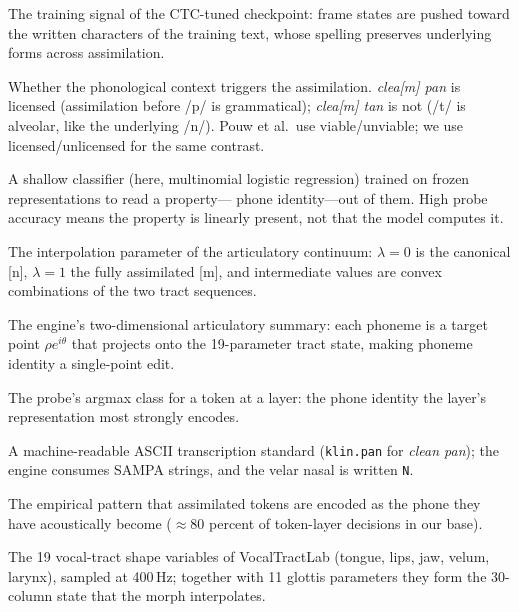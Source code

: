 \documentclass[11pt,a4paper]{article}
\newcommand{\sampa}[1]{\texttt{#1}}
\newcommand{\lam}{\lambda}
\begin{document}
\begin{description}[leftmargin=1.4em, itemsep=3pt, font=\normalfont\bfseries]
\item[Letter supervision] The training signal of the CTC-tuned
checkpoint: frame states are pushed toward the written characters of
the training text, whose spelling preserves underlying forms across
assimilation.

\item[Licensing (viable / unviable)] Whether the phonological
context triggers the assimilation. \emph{clea[m] pan} is licensed
(assimilation before /p/ is grammatical); \emph{clea[m] tan} is not
(/t/ is alveolar, like the underlying /n/). Pouw et al.\ use
viable/unviable; we use licensed/unlicensed for the same contrast.

\item[Linear probe] A shallow classifier (here, multinomial logistic
regression) trained on frozen representations to read a property---
phone identity---out of them. High probe accuracy means the property
is linearly present, not that the model computes it.

\item[Morph strength ($\lam$)] The interpolation parameter of the
articulatory continuum: $\lam=0$ is the canonical [n], $\lam=1$ the
fully assimilated [m], and intermediate values are convex
combinations of the two tract sequences.

\item[Polar control plane] The engine's two-dimensional articulatory
summary: each phoneme is a target point $\rho e^{i\theta}$ that
projects onto the 19-parameter tract state, making phoneme identity a
single-point edit.

\item[Probe verdict] The probe's argmax class for a token at a layer:
the phone identity the layer's representation most strongly encodes.

\item[SAMPA] A machine-readable ASCII transcription standard
(\sampa{klin.pan} for \emph{clean pan}); the engine consumes SAMPA
strings, and the velar nasal is written \sampa{N}.

\item[Surface dominance] The empirical pattern that assimilated
tokens are encoded as the phone they have acoustically become
($\approx$80 percent of token-layer decisions in our base).

\item[Tract parameters] The 19 vocal-tract shape variables of
VocalTractLab (tongue, lips, jaw, velum, larynx), sampled at
400\,Hz; together with 11 glottis parameters they form the 30-column
state that the morph interpolates.


\end{description}
\end{document}
